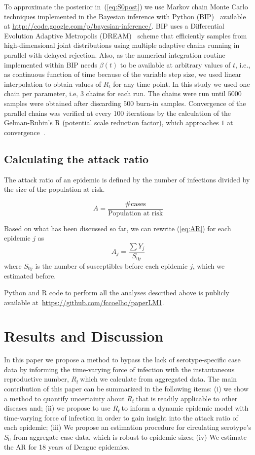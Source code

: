 \documentclass[10pt]{article}
\def \rr {$R_{t}\:$}
\begin{document}
To approximate the posterior in~(\ref{eq:S0post}) we use Markov chain Monte 
Carlo techniques implemented in the Bayesian inference with Python 
(BIP)~\cite{pone2011} available at  
\url{http://code.google.com/p/bayesian-inference/}.
BIP uses a Differential Evolution Adaptive Metropolis (DREAM)~\cite{vrugt2008} 
scheme that efficiently samples from high-dimensional joint distributions using 
multiple adaptive chains running in parallel with delayed rejection.
Also, as the numerical integration routine implemented within BIP needs 
$\beta(t)$ to be available at 
arbitrary values of $t$, i.e., as continuous function of time because of the 
variable step size, we used linear interpolation to obtain values of $R_t$ for 
any time point.
In this study we used one chain per parameter, i.e, 3 chains for each run.
The chains were run until $5000$ samples were obtained after discarding $500$ 
burn-in samples.
Convergence of the parallel chains was verified at every 100 iterations by the 
calculation of the Gelman-Rubin's R (potential scale 
reduction factor), which approaches $1$ at convergence~\cite{brooks1998}.

\subsection*{Calculating the attack ratio}

The attack ratio of an epidemic is defined by the number of infections divided 
by the size of the population at risk.

\begin{equation}
\label{eq:AR}
A=\frac{\text{\# cases}}{\text{Population at risk}} 
\end{equation}

Based on what has been discussed so far, we can rewrite (\ref{eq:AR}) for 
each epidemic $j$ as
\begin{equation}
\label{eq:AR2}
 A_{j}=\frac{\sum Y_j}{S_{0j}}
\end{equation}
where $S_{0j}$ is the number of susceptibles before each epidemic $j$, which we
estimated before.

Python and R code to perform all the analyses described above is publicly 
available at~\url{https://github.com/fccoelho/paperLM1}.

\section*{Results and Discussion}

In this paper we propose a method to bypass the lack of serotype-specific case 
data by informing the time-varying force of infection with the instantaneous 
reproductive number, \rr which we calculate from aggregated data.
The main contribution of this paper can be summarized in the following items: 
(i) we show a method to quantify uncertainty 
about \rr that is readily applicable to other diseases and; (ii) we propose to 
use \rr to inform a dynamic epidemic model with time-varying force of infection 
in order to gain insight into the attack ratio of each epidemic; (iii) We 
propose an estimation procedure for circulating serotype's $S_0$ from 
aggregate case data, which is robust to epidemic sizes; (iv) We estimate the AR 
for 18 years of Dengue epidemics. 
\end{document}
